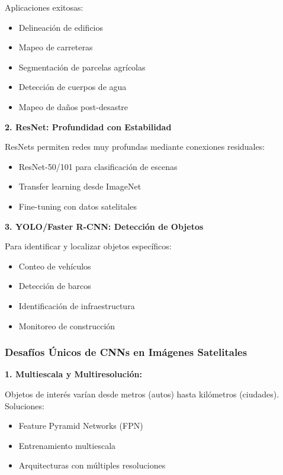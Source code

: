 \documentclass[12pt,a4paper]{article}
\begin{document}
Aplicaciones exitosas:
\begin{itemize}
    \item Delineación de edificios
    \item Mapeo de carreteras
    \item Segmentación de parcelas agrícolas
    \item Detección de cuerpos de agua
    \item Mapeo de daños post-desastre
\end{itemize}

\textbf{2. ResNet: Profundidad con Estabilidad}

ResNets permiten redes muy profundas mediante conexiones residuales:

\begin{itemize}
    \item ResNet-50/101 para clasificación de escenas
    \item Transfer learning desde ImageNet
    \item Fine-tuning con datos satelitales
\end{itemize}

\textbf{3. YOLO/Faster R-CNN: Detección de Objetos}

Para identificar y localizar objetos específicos:
\begin{itemize}
    \item Conteo de vehículos
    \item Detección de barcos
    \item Identificación de infraestructura
    \item Monitoreo de construcción
\end{itemize}

\subsubsection{Desafíos Únicos de CNNs en Imágenes Satelitales}

\textbf{1. Multiescala y Multiresolución:}

Objetos de interés varían desde metros (autos) hasta kilómetros (ciudades). Soluciones:
\begin{itemize}
    \item Feature Pyramid Networks (FPN)
    \item Entrenamiento multiescala
    \item Arquitecturas con múltiples resoluciones
\end{itemize}
\end{document}
